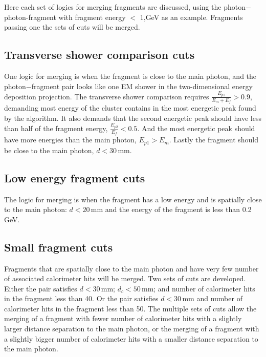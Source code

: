 Here each set of logics for merging fragments are discussed, using the photon$-$photon-fragment with fragment energy $<$ 1,GeV as an example. Fragments passing one the sets of cuts will be merged.



\subsection{Transverse shower comparison cuts}

One logic for merging is when the fragment is close to the main photon, and the photon$-$fragment pair looks like one EM shower in the two-dimensional energy deposition projection. The transverse shower comparison requires $\frac{E_{p1}}{E_m + E_f} > 0.9 $, demanding  most energy of the cluster contains in the most energetic peak found by the  \peakFinding algorithm. It also demands that the second energetic peak should have less than half of the fragment energy,  $\frac{E_{p2}}{E_f} < 0.5 $. And the most energetic peak should have more energies than the main photon,   $E_{p1} > E_m$. Lastly the fragment should be close to the main photon, $d < 30 $\,mm.




\subsection{Low energy fragment cuts}

The logic for merging  is when the fragment has a low energy and is spatially close to the main photon: $d < 20 $\,mm and the energy of the fragment is less than 0.2\,GeV.

 \subsection{Small fragment cuts}

Fragments that are spatially close to the main photon and have very few number of associated calorimeter hits will be merged.  Two sets of cuts are developed. Either the pair satisfies  $d < 30 $\,mm; $d_c < 50 $\,mm; and number of calorimeter hits in the fragment less than 40. Or the pair satisfies $d < 30 $\,mm and number of calorimeter hits in the fragment less than 50. The multiple sets of cuts allow the merging of a fragment with fewer number of  calorimeter hits with a slightly larger distance separation to the main photon, or the merging of a fragment with a slightly bigger number of  calorimeter hits with a smaller distance separation to the main photon.

